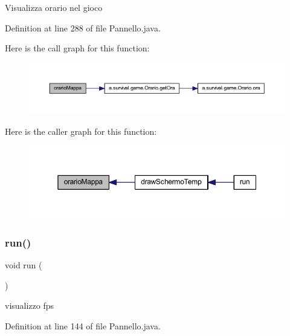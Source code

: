 Visualizza orario nel gioco 

Definition at line 288 of file Pannello.\+java.

Here is the call graph for this function\+:
\nopagebreak
\begin{figure}[H]
\begin{center}
\leavevmode
\includegraphics[width=350pt]{classa_1_1survival_1_1game_1_1_pannello_abe2c4192cc87f74e6d45d5b5fe5283c3_cgraph}
\end{center}
\end{figure}
Here is the caller graph for this function\+:
\nopagebreak
\begin{figure}[H]
\begin{center}
\leavevmode
\includegraphics[width=350pt]{classa_1_1survival_1_1game_1_1_pannello_abe2c4192cc87f74e6d45d5b5fe5283c3_icgraph}
\end{center}
\end{figure}
\mbox{\label{classa_1_1survival_1_1game_1_1_pannello_a13a43e6d814de94978c515cb084873b1}} 
\subsubsection{\texorpdfstring{run()}{run()}}
{\footnotesize\ttfamily void run (\begin{DoxyParamCaption}{ }\end{DoxyParamCaption})}



visualizzo fps 



Definition at line 144 of file Pannello.\+java.

